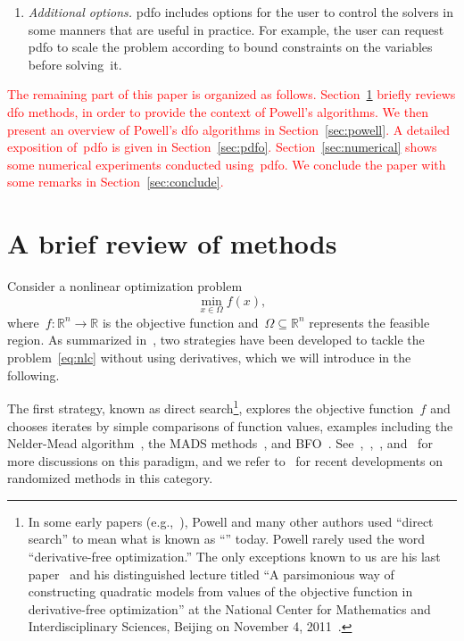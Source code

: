 \documentclass[
    smallextended,  %
    final,        %
]{svjour3}
\newcommand{\R}{\mathbb{R}}
\newcommand{\fset}{\Omega}
\newcommand{\obj}{f}
\newcommand{\red}{\textcolor{red}}
\begin{document}
\begin{enumerate}
    \item \emph{Additional options.}
    \Gls{pdfo} includes options for the user to control the solvers in some manners that are useful in practice.
    For example, the user can request \gls{pdfo} to scale the problem according to bound constraints on the variables before solving~it.
\end{enumerate}

\red{
The remaining part of this paper is organized as follows.
Section~\ref{sec:dfo} briefly reviews \gls{dfo} methods, in order to provide the context of Powell's algorithms.
We then present an overview of Powell's \gls{dfo} algorithms in Section~\ref{sec:powell}.
A detailed exposition of~\gls{pdfo} is given in Section~\ref{sec:pdfo}.
Section~\ref{sec:numerical} shows some numerical experiments conducted using~\gls{pdfo}.
We conclude the paper with some remarks in Section~\ref{sec:conclude}.
}

\section{A brief review of  methods}
\label{sec:dfo}

Consider a nonlinear optimization problem
\begin{equation}
    \label{eq:nlc}
    \min_{x \in \fset} \obj(x),
\end{equation}
where~$\obj : \R^n \to \R$ is the objective function and~$\fset \subseteq \R^n$ represents the feasible region.
As summarized in~\cite{Conn_Scheinberg_Vicente_2009b}, two strategies have been developed to tackle
the problem~\eqref{eq:nlc} without using derivatives, which we will introduce in the following.

The first strategy, known as direct search\footnote{In some early papers (e.g.,~\cite{Powell_1994,Powell_1998}),
Powell and many other authors used ``direct search'' to mean what is known as ``'' today. Powell rarely used the word ``derivative-free optimization.''
The only exceptions known to us are his last paper~\cite{Powell_2015} and his distinguished lecture
titled ``A parsimonious way of constructing quadratic models from values of the objective function in
derivative-free optimization'' at the National Center for Mathematics and Interdisciplinary Sciences,
Beijing on November 4, 2011~\cite{Buhmann_Fletcher_Iserles_Toint_2018}.}, explores the objective function~$\obj$ and chooses iterates by simple comparisons of function values, examples including the Nelder-Mead algorithm~\cite{Nelder_Mead_1965}, the MADS methods~\cite{Audet_Dennis_2006,Abramson_Audet_2006,Digabel_2011}, and BFO~\cite{Porcelli_Toint_2017,Porcelli_Toint_2020,Porcelli_Toint_2022}.
See~\cite{Kolda_Lewis_Torczon_2003},~\cite[Chapters~7 and~8]{Conn_Scheinberg_Vicente_2009b},~\cite[Part~3]{Audet_Hare_2017}, and~\cite[\S~2.1]{Larson_Menickelly_Wild_2019} for more discussions on this paradigm, and we refer to~\cite{Gratton_Etal_2015,Gratton_Etal_2019} for recent developments on randomized methods in this category.
\end{document}
